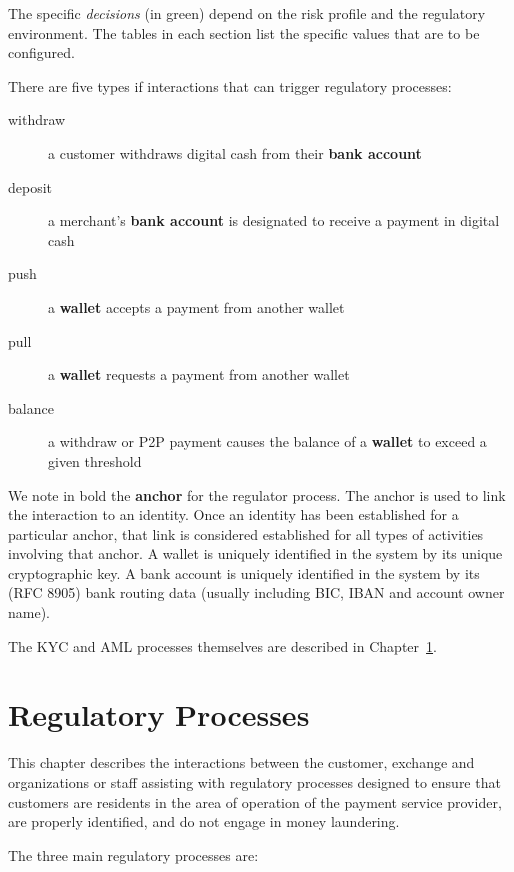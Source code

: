 \documentclass[10pt,a4paper,oneside]{book}
\begin{document}
The specific {\em decisions} (in green) depend on the risk profile and the
regulatory environment. The tables in each section list the specific values
that are to be configured.

There are five types if interactions that can trigger regulatory processes:

\begin{description}
  \item[withdraw] a customer withdraws digital cash from their {\bf bank account}
  \item[deposit] a merchant's {\bf bank account} is designated to receive a payment in digital cash
  \item[push] a {\bf wallet} accepts a payment from another wallet
  \item[pull] a {\bf wallet} requests a payment from another wallet
  \item[balance] a withdraw or P2P payment causes the balance of a {\bf wallet} to exceed a given threshold
\end{description}

We note in bold the {\bf anchor} for the regulator process. The anchor is used
to link the interaction to an identity.  Once an identity has been established
for a particular anchor, that link is considered established for all types of
activities involving that anchor.  A wallet is uniquely identified in the
system by its unique cryptographic key.  A bank account is uniquely identified
in the system by its (RFC 8905) bank routing data (usually including BIC, IBAN
and account owner name).

The KYC and AML processes themselves are described in
Chapter~\ref{chap:regproc}.







\chapter{Regulatory Processes} \label{chap:regproc}

This chapter describes the interactions between the customer, exchange and
organizations or staff assisting with regulatory processes designed to ensure
that customers are residents in the area of operation of the payment service
provider, are properly identified, and do not engage in money laundering.

The three main regulatory processes are:
\end{document}
